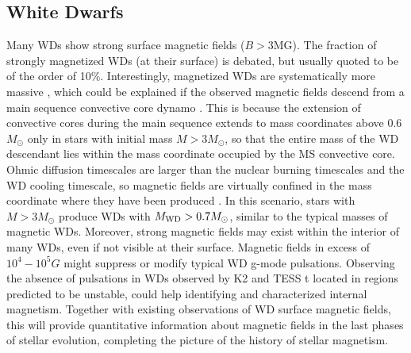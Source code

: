 {\color{red} \subsection{White Dwarfs}}
Many WDs show strong surface magnetic fields ($B>$3MG). The fraction of strongly magnetized WDs (at their surface) is debated, but usually quoted to be of the order of 10\%. Interestingly, magnetized WDs are systematically more massive \cite{Ferrario_2015}, which could be explained if the observed magnetic fields descend from a main sequence convective core dynamo \cite{Cantiello_2016}. This is because the extension of convective cores during the main sequence extends to mass coordinates above 0.6$M_\odot$ only in stars with initial mass $M>3M_\odot$, so that the entire mass of the WD descendant lies within the mass coordinate occupied by the MS convective core. Ohmic diffusion timescales are larger than the nuclear burning timescales and the WD cooling timescale, so magnetic fields are virtually confined in the mass coordinate where they have been produced \cite{Cantiello_2016}. In this scenario, stars with $M>3M_\odot$ produce WDs with $M_{\rm WD}>0.7M_\odot$, similar to the typical masses of magnetic WDs. Moreover, strong magnetic fields may exist within the interior of many WDs, even if not visible at their surface. Magnetic fields in excess of $10^4-10^5 G$ might suppress or modify typical WD g-mode pulsations. Observing the absence of pulsations in WDs observed by K2 and TESS t located in regions predicted to be unstable, could help identifying and characterized internal magnetism. Together with existing observations of WD surface magnetic fields, this will provide quantitative information about magnetic fields in the last phases of stellar evolution,  completing the picture of the history of stellar magnetism.


